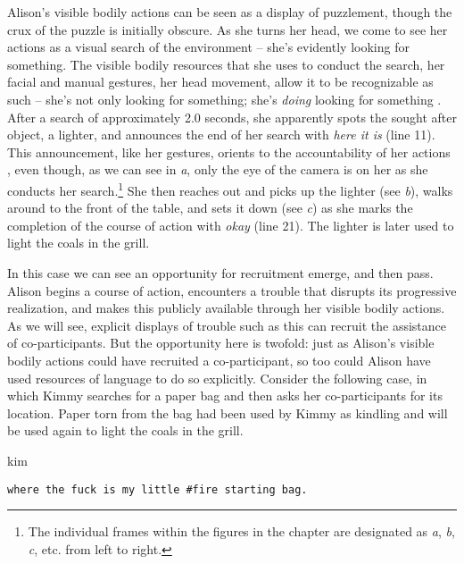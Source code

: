 \documentclass[output=paper,nonflat,modfont,draft]{langsci/langscibook}
\begin{document}
Alison’s visible bodily actions can be seen as a display of puzzlement, though the crux of the puzzle is initially obscure. As she turns her head, we come to see her actions as a visual search of the environment \citep{DrewKendrick2018} -- she’s evidently looking for something. The visible bodily resources that she uses to conduct the search, her facial and manual gestures, her head movement, allow it to be recognizable as such -- she’s not only looking for something; she’s \textit{doing} looking for something \citep{Sacks1984}. After a search of approximately 2.0 seconds, she apparently spots the sought after object, a lighter, and announces the end of her search with \textit{here it is} (line 11). This announcement, like her gestures, orients to the accountability of her actions \citep{Garfinkel1967}, even though, as we can see in \textit{a}, only the eye of the camera is on her as she conducts her search.\footnote{The individual frames within the figures in the chapter are designated as \textit{a}, \textit{b}, \textit{c}, etc. from left to right.} She then reaches out and picks up the lighter (see \textit{b}), walks around to the front of the table, and sets it down (see \textit{c}) as she marks the completion of the course of action with \textit{okay} (line 21). The lighter is later used to light the coals in the grill.

In this case we can see an opportunity for recruitment emerge, and then pass. Alison begins a course of action, encounters a trouble that disrupts its progressive realization, and makes this publicly available through her visible bodily actions. As we will see, explicit displays of trouble such as this can recruit the assistance of co-participants. But the opportunity here is twofold: just as Alison’s visible bodily actions could have recruited a co-participant, so too could Alison have used resources of language to do so explicitly. Consider the following case, in which Kimmy searches for a paper bag and then asks her co-participants for its location. Paper torn from the bag had been used by Kimmy as kindling and will be used again to light the coals in the grill.




\begin{mdframedkendrick}[style=firstfoc]
\begin{transbox}{3}{kim}
\begin{verbatim}
where the fuck is my little #fire starting bag.
\end{verbatim}
\end{transbox}
\end{mdframedkendrick}\vspace{-5mm}
\end{document}
